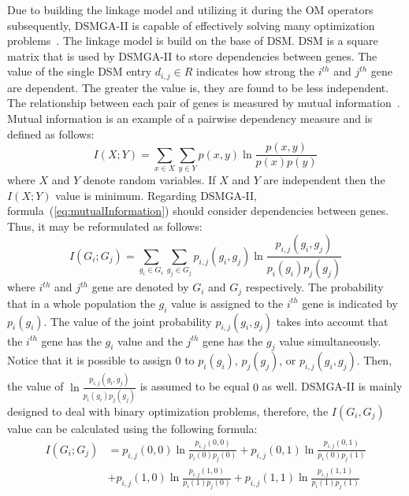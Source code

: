 Due to building the linkage model and utilizing it during the OM operators subsequently, DSMGA-II is capable of effectively solving many optimization problems~\cite{dsmga2, dsmga2e, fp3}. The linkage model is build on the base of DSM. DSM is a square matrix that is used by DSMGA-II to store dependencies between genes. The value of the single DSM entry $d_{i,j} \in R$ indicates how strong the $i^{th}$ and $j^{th}$ gene are dependent. The greater the value is, they are found to be less independent. The relationship between each pair of genes is measured by mutual information~\cite{mutualInformation}. Mutual information is an example of a pairwise dependency measure and is defined as follows:
\begin{equation}
	\label{eq:mutualInformation}
	I(X;Y) = \sum_{x \in X} \sum_{y \in Y} p(x, y) \ln\frac{p(x,y)}{p(x)p(y)}
\end{equation}
where $X$ and $Y$ denote random variables. If $X$ and $Y$ are independent then the $I(X;Y)$ value is minimum. Regarding DSMGA-II, formula~(\ref{eq:mutualInformation}) 
should consider dependencies between genes. Thus, it may be reformulated as follows:
\begin{equation}
	I(G_i;G_j) = \sum_{g_i \in G_i} \sum_{g_j \in G_j} p_{i,j}(g_i, g_j) \ln\frac{p_{i,j}(g_i,g_j)}{p_i(g_i)p_j(g_j)}
\end{equation}
where $i^{th}$ and $j^{th}$ gene are denoted by $G_i$ and $G_j$ respectively. The probability that in a whole population the $g_i$ value is assigned to the $i^{th}$ gene is indicated by $p_i(g_i)$. The value of the joint probability $p_{i,j}(g_i, g_j)$ takes into account that the $i^{th}$ gene has the $g_i$ value and the $j^{th}$ gene has the $g_j$ value simultaneously. Notice that it is possible to assign $0$ to $p_i(g_i)$, $p_j(g_j)$, or $p_{i,j}(g_i, g_j)$. Then, the value of $\ln{\frac{p_{i,j}(g_i, g_j)}{p_i(g_i)p_j(g_j)}}$ is assumed to be equal $0$ as well. DSMGA-II is mainly designed to deal with binary optimization problems, therefore, the $I(G_i,G_j)$ value can be calculated using the following formula:
\begin{equation}
	\begin{aligned}
	I(G_i;G_j) &= p_{i,j}(0, 0) \ln{\frac{p_{i,j}(0, 0)}{p_i(0)p_j(0)}} + p_{i,j}(0, 1) \ln{\frac{p_{i,j}(0, 1)}{p_i(0)p_j(1)}} \\& + p_{i,j}(1, 0) \ln{\frac{p_{i,j}(1, 0)}{p_i(1)p_j(0)}}+ p_{i,j}(1, 1) \ln{\frac{p_{i,j}(1, 1)}{p_i(1)p_j(1)}}
	\end{aligned}
\end{equation}

